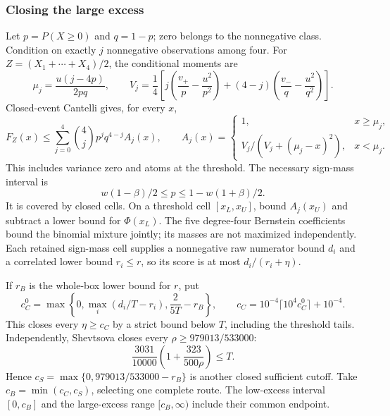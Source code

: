 \subsubsection{Closing the large excess}
Let $p=P(X\ge0)$ and $q=1-p$; zero belongs to the nonnegative class.
Condition on exactly $j$ nonnegative observations among four.
For $Z=(X_1+\cdots+X_4)/2$, the conditional moments are
\[
 \mu_j=\frac{u(j-4p)}{2pq},\qquad
 V_j=\frac14\left[j\left(\frac{v_+}{p}-\frac{u^2}{p^2}\right)
 +(4-j)\left(\frac{v_-}{q}-\frac{u^2}{q^2}\right)\right].
\]
Closed-event Cantelli gives, for every $x$,
\begin{equation}\label{ext:n4:eq:count-cantelli}
 F_Z(x)\le\sum_{j=0}^4\binom4j p^jq^{4-j}A_j(x),\qquad
 A_j(x)=\begin{cases}1,&x\ge\mu_j,\\
 V_j/(V_j+(\mu_j-x)^2),&x<\mu_j.
 \end{cases}
\end{equation}
This includes variance zero and atoms at the threshold. The necessary
sign-mass interval is
\[
 w(1-\beta)/2\le p\le1-w(1+\beta)/2.
\]
It is covered by closed cells. On a threshold cell $[x_L,x_U]$,
bound $A_j(x_U)$ and subtract a lower bound for $\Phi(x_L)$.
The five degree-four Bernstein coefficients bound the binomial
mixture jointly; its masses are not maximized independently.
Each retained sign-mass cell supplies a nonnegative raw numerator
bound $d_i$ and a correlated lower bound $r_i\le r$, so its score
is at most $d_i/(r_i+\eta)$.

If $r_B$ is the whole-box lower bound for $r$, put
\[
 c_C^0=\max\left\{0,\max_i(d_i/T-r_i),\frac{2}{5T}-r_B\right\},
 \qquad
 c_C=10^{-4}\lceil10^4c_C^0\rceil+10^{-4}.
\]
This closes every $\eta\ge c_C$ by a strict bound below $T$,
including the threshold tails. Independently, Shevtsova closes
every $\rho\ge979013/533000$:
\[
 \frac{3031}{10000}\left(1+\frac{323}{500\rho}\right)\le T.
\]
Hence $c_S=\max\{0,979013/533000-r_B\}$ is another closed sufficient
cutoff. Take $c_B=\min(c_C,c_S)$, selecting one complete route.
The low-excess interval $[0,c_B]$ and the large-excess range
$[c_B,\infty)$ include their common endpoint.

